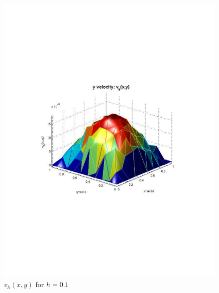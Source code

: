 \documentclass[12pt]{article}
\begin{document}
                \begin{figure}[htb]
                    \begin{center}
                \includegraphics[scale=0.50]{./../files/box/1v.pdf}
                \caption{$v_h(x,y)$ for $h = 0.1$}
            \end{center}
            \end{figure}
\end{document}
